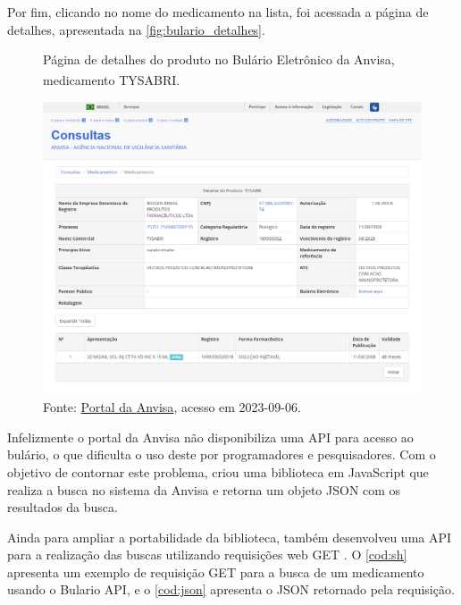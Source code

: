 Por fim, clicando no nome do medicamento na lista, foi acessada a página de detalhes, apresentada na \autoref{fig:bulario_detalhes}.

\begin{figure}[!htbp]
    \centering
    \caption[Página de detalhes do produto no Bulário Eletrônico da \acs{Anvisa}]{Página de detalhes do produto no Bulário Eletrônico da \acs{Anvisa}, medicamento TYSABRI\textsuperscript{\tiny\textregistered}.}
    \label{fig:bulario_detalhes}
    \includegraphics[width=\textwidth]{../pictures/bulario_detalhes.png}
    \caption*{Fonte: \href{https://consultas.Anvisa.gov.br/\#/medicamentos/25351216949200755/}{Portal da \ac{Anvisa}}, acesso em 2023-09-06.}
\end{figure}

Infelizmente o portal da \ac{Anvisa} não disponibiliza uma \ac{API} para acesso ao bulário, o que dificulta o uso deste por programadores e pesquisadores.
Com o objetivo de contornar este problema, \citeauthor{landin2022bulario} \cite{landin2022bulario} criou uma biblioteca em JavaScript que realiza a busca no sistema da \ac{Anvisa} e retorna um objeto JSON com os resultados da busca.

Ainda para ampliar a portabilidade da biblioteca, \citeauthor{landin2022api} também desenvolveu uma \ac{API} para a realização das buscas utilizando requisições web GET \cite{landin2022api}.
O \autoref{cod:sh} apresenta um exemplo de requisição GET para a busca de um medicamento usando o Bulario \ac{API}, e o \autoref{cod:json} apresenta o JSON retornado pela requisição.

